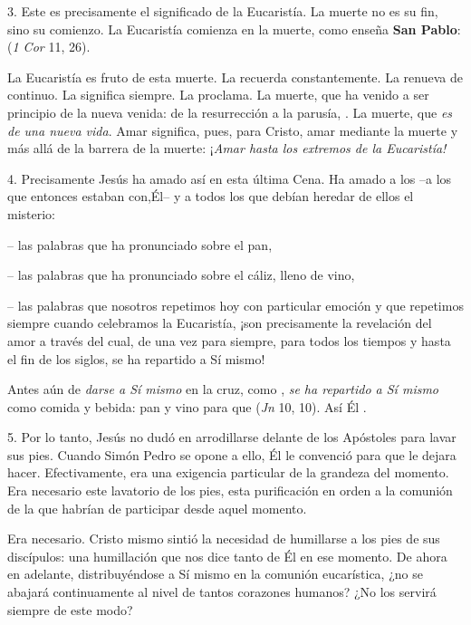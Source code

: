 \begin{body}
3. Este es precisamente el significado de la Eucaristía. La muerte no es su fin, sino su comienzo. La Eucaristía comienza en la muerte, como enseña \textbf{San Pablo}:  (\textit{1 Cor} 11, 26).

La Eucaristía es fruto de esta muerte. La recuerda constantemente. La renueva de continuo. La significa siempre. La proclama. La muerte, que ha venido a ser principio de la nueva venida: de la resurrección a la parusía, . La muerte, que \textit{es  de una nueva vida}. Amar  significa, pues, para Cristo, amar mediante la muerte y más allá de la barrera de la muerte: ¡\textit{Amar hasta los extremos de la Eucaristía!}

4. Precisamente Jesús ha amado así en esta última Cena. Ha amado a los  –a los que entonces estaban con,Él– y a todos los que debían heredar de ellos el misterio:

– las palabras que ha pronunciado sobre el pan,

– las palabras que ha pronunciado sobre el cáliz, lleno de vino,

– las palabras que nosotros repetimos hoy con particular emoción y que repetimos siempre cuando celebramos la Eucaristía, ¡son precisamente la revelación del amor a través del cual, de una vez para siempre, para todos los tiempos y hasta el fin de los siglos, se ha repartido a Sí mismo!

Antes aún de \textit{darse a Sí mismo} en la cruz, como , \textit{se ha repartido a Sí mismo} como comida y bebida: pan y vino para que  (\textit{Jn} 10, 10). Así Él .

5. Por lo tanto, Jesús no dudó en arrodillarse delante de los Apóstoles para lavar sus pies. Cuando Simón Pedro se opone a ello, Él le convenció para que le dejara hacer. Efectivamente, era una exigencia particular de la grandeza del momento. Era necesario este lavatorio de los pies, esta purificación en orden a la comunión de la que habrían de participar desde aquel momento.

Era necesario. Cristo mismo sintió la necesidad de humillarse a los pies de sus discípulos: una humillación que nos dice tanto de Él en ese momento. De ahora en adelante, distribuyéndose a Sí mismo en la comunión eucarística, ¿no se abajará continuamente al nivel de tantos corazones humanos? ¿No los servirá siempre de este modo?


\end{body}
